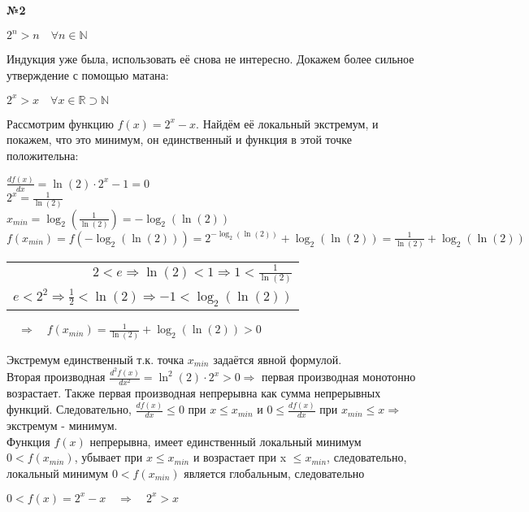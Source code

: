 \documentclass{article}
\newenvironment{task}{\begin{center}\fontsize{14}{14}\selectfont\bf}{\rm\fontsize{12}{12}\selectfont\end{center}}
\begin{document}
	\begin{task} 
		№2
	\end{task}
	\begin{center}
		$2^n > n \quad \forall n \in \mathbb{N}$
	\end{center}
	Индукция уже была, использовать её снова не интересно. Докажем более сильное утверждение с помощью матана:
	\begin{center}
		$2^x > x  \quad \forall x \in \mathbb{R} \supset \mathbb{N}$
	\end{center}
	Рассмотрим функцию $f(x) = 2^x - x$. Найдём её локальный экстремум, и покажем, что это минимум, он единственный и функция в этой точке положительна:
	\begin{center}
		$\frac{df(x)}{dx} = \ln(2)\cdot 2^x - 1 = 0$ \\
		$2^x = \frac{1}{\ln(2)}$ \\
		$x_{min} = \log_2\left(\frac{1}{\ln(2)}\right) = -\log_2(\ln(2))$ \\
		$f(x_{min}) = f(-\log_2(\ln(2))) = 2^{-\log_2(\ln(2))} + \log_2(\ln(2)) = \frac{1}{\ln(2)} + \log_2(\ln(2))$ \\
		\begin{tabular}{r|}
			$2 < e \Rightarrow \ln(2) < 1 \Rightarrow 1 < \frac{1}{\ln(2)}$ \\
			$e < 2^2 \Rightarrow \frac{1}{2} < \ln(2) \Rightarrow -1 < \log_2(\ln(2))$ \\
		\end{tabular} $\quad \Rightarrow \quad f(x_{min}) = \frac{1}{\ln(2)} + \log_2(\ln(2)) > 0$
		
		
	\end{center}
	Экстремум единственный т.к. точка $x_{min}$ задаётся явной формулой. \\
	Вторая производная $\frac{d^2f(x)}{dx^2} = \ln^2(2)\cdot 2^x > 0 \Rightarrow$ первая производная монотонно возрастает. Также первая производная непрерывна как сумма непрерывных функций. Следовательно, $\frac{df(x)}{dx} \leq 0 $ при $x \leq x_{min}$ и $0 \leq \frac{df(x)}{dx}$ при $x_{min} \leq x \Rightarrow$ экстремум - минимум. \\
	Функция $f(x)$ непрерывна, имеет единственный локальный минимум $ 0 < f(x_{min})$, убывает при $x \leq x_{min}$ и возрастает при x $\leq x_{min}$, следовательно, локальный минимум $ 0 < f(x_{min})$ является глобальным, следовательно \\ \begin{center} $0 < f(x) = 2^x-x \quad\Rightarrow\quad 2^x > x$ \end{center}
	
\end{document}
